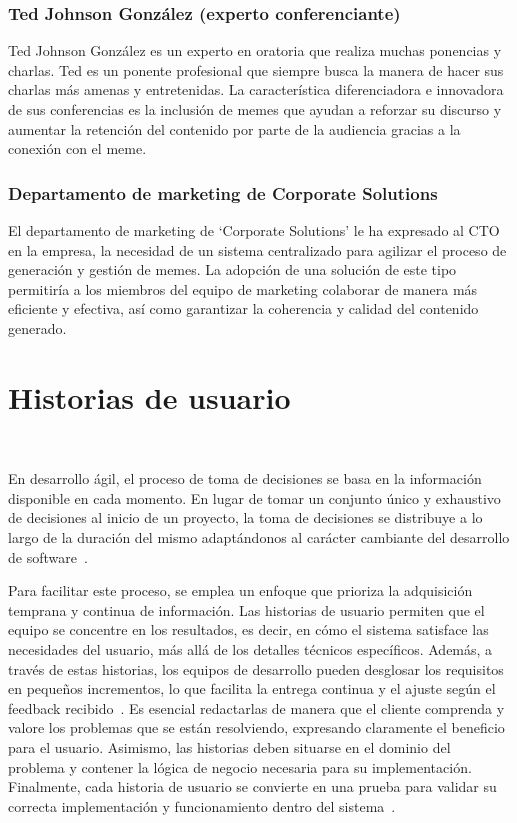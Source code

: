 \subsubsection{Ted Johnson González (experto conferenciante)}

Ted Johnson González es un experto en oratoria que realiza muchas ponencias y charlas. Ted es un ponente profesional que siempre busca la manera de hacer sus charlas más amenas y entretenidas. La característica diferenciadora e innovadora de sus conferencias es la inclusión de memes que ayudan a reforzar su discurso y aumentar la retención del contenido por parte de la audiencia gracias a la conexión con el meme.

\subsubsection{Departamento de marketing de Corporate Solutions}

El departamento de marketing de ‘Corporate Solutions’ le ha expresado al CTO en la empresa, la necesidad de un sistema centralizado para agilizar el proceso de generación y gestión de memes. La adopción de una solución de este tipo permitiría a los miembros del equipo de marketing colaborar de manera más eficiente y efectiva, así como garantizar la coherencia y calidad del contenido generado.

\section{Historias de usuario}~\label{sec:historias_de_usuario}

En desarrollo ágil, el proceso de toma de decisiones se basa en la información disponible en cada momento. En lugar de tomar un conjunto único y exhaustivo de decisiones al inicio de un proyecto, la toma de decisiones se distribuye a lo largo de la duración del mismo adaptándonos al carácter cambiante del desarrollo de software~\cite{cohn2004user}.

Para facilitar este proceso, se emplea un enfoque que prioriza la adquisición temprana y continua de información. Las historias de usuario permiten que el equipo se concentre en los resultados, es decir, en cómo el sistema satisface las necesidades del usuario, más allá de los detalles técnicos específicos. Además, a través de estas historias, los equipos de desarrollo pueden desglosar los requisitos en pequeños incrementos, lo que facilita la entrega continua y el ajuste según el feedback recibido~\cite{schwaber2001agile}. Es esencial redactarlas de manera que el cliente comprenda y valore los problemas que se están resolviendo, expresando claramente el beneficio para el usuario. Asimismo, las historias deben situarse en el dominio del problema y contener la lógica de negocio necesaria para su implementación. Finalmente, cada historia de usuario se convierte en una prueba para validar su correcta implementación y funcionamiento dentro del sistema~\cite{rubin2012essential}.

